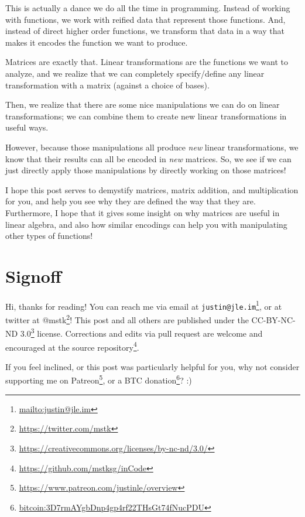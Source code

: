 \documentclass[]{article}
\renewcommand{\href}[2]{#2\footnote{\url{#1}}}
\begin{document}
This is actually a dance we do all the time in programming. Instead of working
with functions, we work with reified data that represent those functions. And,
instead of direct higher order functions, we transform that data in a way that
makes it encodes the function we want to produce.

Matrices are exactly that. Linear transformations are the functions we want to
analyze, and we realize that we can completely specify/define any linear
transformation with a matrix (against a choice of bases).

Then, we realize that there are some nice manipulations we can do on linear
transformations; we can combine them to create new linear transformations in
useful ways.

However, because those manipulations all produce \emph{new} linear
transformations, we know that their results can all be encoded in \emph{new}
matrices. So, we see if we can just directly apply those manipulations by
directly working on those matrices!

I hope this post serves to demystify matrices, matrix addition, and
multiplication for you, and help you see why they are defined the way that they
are. Furthermore, I hope that it gives some insight on why matrices are useful
in linear algebra, and also how similar encodings can help you with manipulating
other types of functions!

\section{Signoff}\label{signoff}

Hi, thanks for reading! You can reach me via email at
\href{mailto:justin@jle.im}{\nolinkurl{justin@jle.im}}, or at twitter at
\href{https://twitter.com/mstk}{@mstk}! This post and all others are published
under the \href{https://creativecommons.org/licenses/by-nc-nd/3.0/}{CC-BY-NC-ND
3.0} license. Corrections and edits via pull request are welcome and encouraged
at \href{https://github.com/mstksg/inCode}{the source repository}.

If you feel inclined, or this post was particularly helpful for you, why not
consider \href{https://www.patreon.com/justinle/overview}{supporting me on
Patreon}, or a \href{bitcoin:3D7rmAYgbDnp4gp4rf22THsGt74fNucPDU}{BTC donation}?
:)
\end{document}
